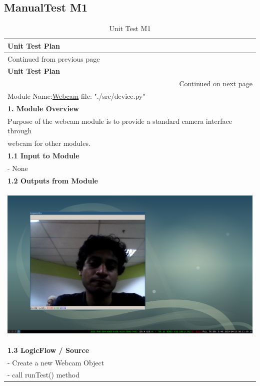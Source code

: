 \documentclass[12pt,a4paper,man]{report}
\begin{document}
\subsection{ManualTest M1}
\label{sec:org829bfc9}
\begin{longtable}{|p{7in}|}
\caption{\label{table:utest_m1}
Unit Test M1}
\\
\hline
\textbf{Unit Test Plan} \cellcolor{blue!25}\\
\hline
\endfirsthead
\multicolumn{1}{l}{Continued from previous page} \\
\hline

\textbf{Unit Test Plan} \cellcolor{blue!25} \\

\hline
\endhead
\hline\multicolumn{1}{r}{Continued on next page} \\
\endfoot
\endlastfoot
\hline
\hline
Module Name:\underline{Webcam} \hspace{2in}  file:  "./src/device.py"\\
\hline
\textbf{1. Module Overview}\\
\hline
Purpose of the webcam module is to provide a standard camera interface through\\
webcam for other modules.\\
\hline
\textbf{1.1 Input to Module}\\
\hline
- None\\
\hline
\textbf{1.2 Outputs from Module}\\
\hline
\begin{center}
\includegraphics[width=.9\linewidth]{./ext_img/ex1.png}
\end{center}\\
\hline
\textbf{1.3 LogicFlow / Source}\\
\hline
- Create a new Webcam Object\\
- call runTest() method\\

\end{longtable}
\end{document}
